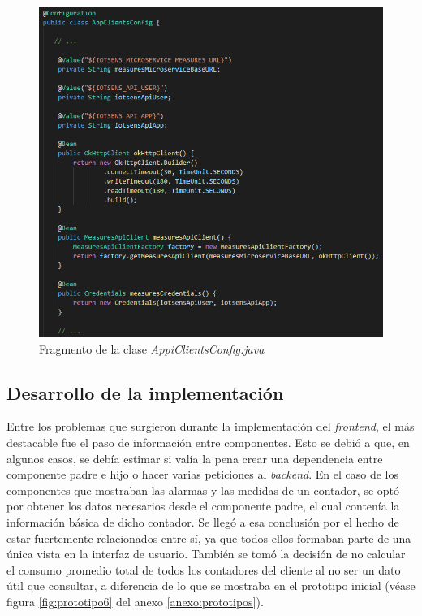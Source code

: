 \documentclass[pdftex,11pt,a4paper]{book}
\begin{document}
 \begin{figure}[H]
 \centering
 \includegraphics [scale=0.65] {images/implementacion/watermeter-config.png}
 \caption{Fragmento de la clase \textit{AppiClientsConfig.java}} \label{fig:watermeter-config}
 \end{figure}
 
 \subsection{Desarrollo de la implementación} \label{subseccion:desarrollo-implementacion}
 
 Entre los problemas que surgieron durante la implementación del \textit{frontend}, el más destacable fue el paso de información entre componentes. Esto se debió a que, en algunos casos, se debía estimar si valía la pena crear una dependencia entre componente padre e hijo o hacer varias peticiones al \textit{backend}. En el caso de los componentes que mostraban las alarmas y las medidas de un contador, se optó por obtener los datos necesarios desde el componente padre, el cual contenía la información básica de dicho contador. Se llegó a esa conclusión por el hecho de estar fuertemente relacionados entre sí, ya que todos ellos formaban parte de una única vista en la interfaz de usuario.
También se tomó la decisión de no calcular el consumo promedio total de todos los contadores del cliente al no ser un dato útil que consultar, a diferencia de lo que se mostraba en el prototipo inicial (véase figura \ref{fig:prototipo6} del anexo \ref{anexo:prototipos}).
\end{document}
